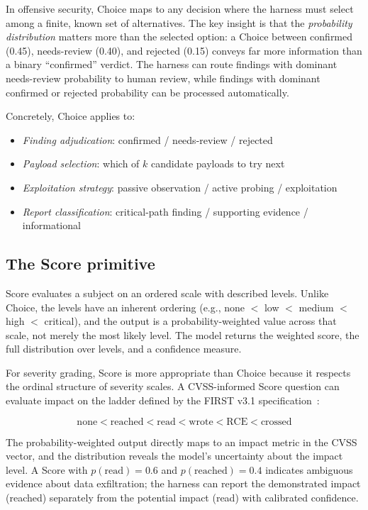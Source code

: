 \documentclass[conference]{IEEEtran}
\begin{document}
In offensive security, Choice maps to any decision where the harness must select among a finite, known set of alternatives. The key insight is that the \emph{probability distribution} matters more than the selected option: a Choice between \textsf{confirmed} (0.45), \textsf{needs-review} (0.40), and \textsf{rejected} (0.15) conveys far more information than a binary ``confirmed'' verdict. The harness can route findings with dominant \textsf{needs-review} probability to human review, while findings with dominant \textsf{confirmed} or \textsf{rejected} probability can be processed automatically.

Concretely, Choice applies to:
\begin{itemize}[leftmargin=*]
\item \emph{Finding adjudication}: confirmed / needs-review / rejected
\item \emph{Payload selection}: which of $k$ candidate payloads to try next
\item \emph{Exploitation strategy}: passive observation / active probing / exploitation
\item \emph{Report classification}: critical-path finding / supporting evidence / informational
\end{itemize}

\subsection{The Score primitive}

Score evaluates a subject on an ordered scale with described levels. Unlike Choice, the levels have an inherent ordering (e.g., none $<$ low $<$ medium $<$ high $<$ critical), and the output is a probability-weighted value across that scale, not merely the most likely level. The model returns the weighted score, the full distribution over levels, and a confidence measure.

For severity grading, Score is more appropriate than Choice because it respects the ordinal structure of severity scales. A CVSS-informed Score question can evaluate impact on the ladder defined by the FIRST v3.1 specification~\cite{first2019cvss}:

\begin{equation}
\text{none} < \text{reached} < \text{read} < \text{wrote} < \text{RCE} < \text{crossed}
\label{eq:ladder}
\end{equation}

The probability-weighted output directly maps to an impact metric in the CVSS vector, and the distribution reveals the model's uncertainty about the impact level. A Score with $p(\text{read}) = 0.6$ and $p(\text{reached}) = 0.4$ indicates ambiguous evidence about data exfiltration; the harness can report the demonstrated impact (reached) separately from the potential impact (read) with calibrated confidence.
\end{document}
